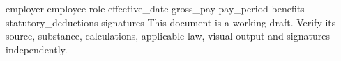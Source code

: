 \documentclass[11pt,a4paper]{article}
\begin{document}
{{employer}}
{{employee}}
{{role}}
{{effective_date}}
{{gross_pay}}
{{pay_period}}
{{benefits}}
{{statutory_deductions}}
{{signatures}}
This document is a working draft. Verify its source, substance, calculations, applicable law, visual output and signatures independently.
\end{document}
